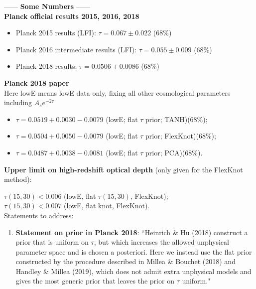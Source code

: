 \documentclass[prd,twocolumn,amsmath,amssymb,floatfix,superscriptaddress,nofootinbib]{revtex4-1}
\begin{document}
{------ \textbf{Some Numbers} ------ \\

\textbf{Planck official results 2015, 2016, 2018} \\

\begin{itemize}
    
    \item Planck 2015 results (LFI): $\tau = 0.067 \pm 0.022$ (68\%) \\

    \item Planck 2016  intermediate results (LFI): $\tau = 0.055 \pm 0.009$ (68\%) \\
    
    \item Planck 2018 results: $\tau = 0.0506 \pm 0.0086$ (68\%) \\

\end{itemize}

\textbf{Planck 2018 paper} \\

Here lowE means lowE data only, fixing all other cosmological parameters including $A_s e^{-2\tau}$\\

\begin{itemize}

\item $\tau = 0.0519+0.0030-0.0079$ (lowE; flat $\tau$ prior; TANH)(68\%); \\

\item $\tau = 0.0504+0.0050
-0.0079$ (lowE; flat $\tau$ prior; FlexKnot)(68\%); \\

\item $\tau = 0.0487+0.0038
-0.0081$ (lowE; flat $\tau$ prior; PCA)(68\%).

\end{itemize}

\textbf{Upper limit on high-redshift optical depth} (only given for the FlexKnot method):

$\tau(15, 30) < 0.006$ (lowE, flat $\tau(15, 30)$, FlexKnot); \\

$\tau(15, 30) < 0.007$ (lowE, flat knot, FlexKnot).\\

Statements to address:

\begin{enumerate}
    \item {\textbf{Statement on prior in Planck 2018}:  ``Heinrich \& Hu (2018) construct a prior that is uniform on $\tau$, but which increases the allowed unphysical parameter space and is chosen a posteriori. Here we instead use the flat prior constructed by the procedure described in Millea \& Bouchet (2018) and Handley \& Millea (2019), which does not admit extra unphysical models and gives the most generic prior that leaves the prior on $\tau$ uniform."}
    

\end{enumerate}}
\end{document}
